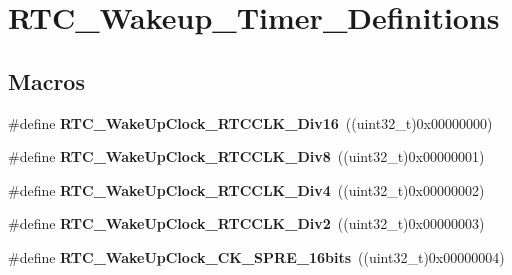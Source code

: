 \hypertarget{group___r_t_c___wakeup___timer___definitions}{\section{R\-T\-C\-\_\-\-Wakeup\-\_\-\-Timer\-\_\-\-Definitions}
\label{group___r_t_c___wakeup___timer___definitions}
}
\subsection*{Macros}
\begin{DoxyCompactItemize}
\item 
\hypertarget{group___r_t_c___wakeup___timer___definitions_ga3bdf3ccdb6fe77e36def1091619fd4a0}{\#define {\bfseries R\-T\-C\-\_\-\-Wake\-Up\-Clock\-\_\-\-R\-T\-C\-C\-L\-K\-\_\-\-Div16}~((uint32\-\_\-t)0x00000000)}\label{group___r_t_c___wakeup___timer___definitions_ga3bdf3ccdb6fe77e36def1091619fd4a0}

\item 
\hypertarget{group___r_t_c___wakeup___timer___definitions_gaac36e5571c3523da94c05698e9c6a5e1}{\#define {\bfseries R\-T\-C\-\_\-\-Wake\-Up\-Clock\-\_\-\-R\-T\-C\-C\-L\-K\-\_\-\-Div8}~((uint32\-\_\-t)0x00000001)}\label{group___r_t_c___wakeup___timer___definitions_gaac36e5571c3523da94c05698e9c6a5e1}

\item 
\hypertarget{group___r_t_c___wakeup___timer___definitions_ga5fc37ef693f9a015bfb0e6dd8706fef0}{\#define {\bfseries R\-T\-C\-\_\-\-Wake\-Up\-Clock\-\_\-\-R\-T\-C\-C\-L\-K\-\_\-\-Div4}~((uint32\-\_\-t)0x00000002)}\label{group___r_t_c___wakeup___timer___definitions_ga5fc37ef693f9a015bfb0e6dd8706fef0}

\item 
\hypertarget{group___r_t_c___wakeup___timer___definitions_ga26b1be336e8cea784dfc7d9d0347f3f7}{\#define {\bfseries R\-T\-C\-\_\-\-Wake\-Up\-Clock\-\_\-\-R\-T\-C\-C\-L\-K\-\_\-\-Div2}~((uint32\-\_\-t)0x00000003)}\label{group___r_t_c___wakeup___timer___definitions_ga26b1be336e8cea784dfc7d9d0347f3f7}

\item 
\hypertarget{group___r_t_c___wakeup___timer___definitions_ga310ac1a50bca0c799f4e34c51a785f84}{\#define {\bfseries R\-T\-C\-\_\-\-Wake\-Up\-Clock\-\_\-\-C\-K\-\_\-\-S\-P\-R\-E\-\_\-16bits}~((uint32\-\_\-t)0x00000004)}\label{group___r_t_c___wakeup___timer___definitions_ga310ac1a50bca0c799f4e34c51a785f84}


\end{DoxyCompactItemize}
